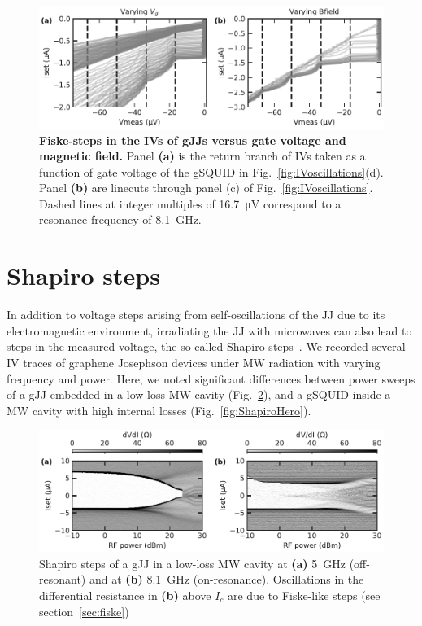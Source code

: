 \begin{figure}
	\centering
	\includegraphics[width=\linewidth]{appendix/gJJ-misc-figs/fig_IVsteps}
	\caption{
		\textbf{Fiske-steps in the IVs of gJJs versus gate voltage and magnetic field.}
		Panel \textbf{(a)} is the return branch of IVs taken as a function of gate voltage of the gSQUID in Fig.~\ref{fig:IVoscillations}(d).
		Panel \textbf{(b)} are linecuts through panel (c) of Fig.~\ref{fig:IVoscillations}.
		Dashed lines at integer multiples of \SI{16.7}{\micro\volt} correspond to a resonance frequency of \SI{8.1}{\giga\hertz}.
	}
	\label{fig:IVsteps}
\end{figure}


\section{Shapiro steps}\label{sec:shapiro}

In addition to voltage steps arising from self-oscillations of the JJ due to its electromagnetic environment, irradiating the JJ with microwaves can also lead to steps in the measured voltage, the so-called Shapiro steps~\cite{shapiroJosephsonCurrentsSuperconducting1963,kautzNoiseChaosJosephson1996,heerscheBipolarSupercurrentGraphene2007a,leeUltimatelyShortBallistic2015}.
%
We recorded several IV traces of graphene Josephson devices under MW radiation with varying frequency and power.
%
Here, we noted significant differences between power sweeps of a gJJ embedded in a low-loss MW cavity (Fig.~\ref{fig:Shapiro2x1}), and a gSQUID inside a MW cavity with high internal losses (Fig.~\ref{fig:ShapiroHero}).

\begin{figure}
	\centering
	\includegraphics[width=\linewidth]{appendix/gJJ-misc-figs/fig_Shapiro2x1}
	\caption{
		Shapiro steps of a gJJ in a low-loss MW cavity at \textbf{(a)} \SI{5}{\giga\hertz} (off-resonant) and at \textbf{(b)} \SI{8.1}{\giga\hertz} (on-resonance).
		Oscillations in the differential resistance in \textbf{(b)} above $I_c$ are due to Fiske-like steps (see section~\ref{sec:fiske})
	}
	\label{fig:Shapiro2x1}
\end{figure}

